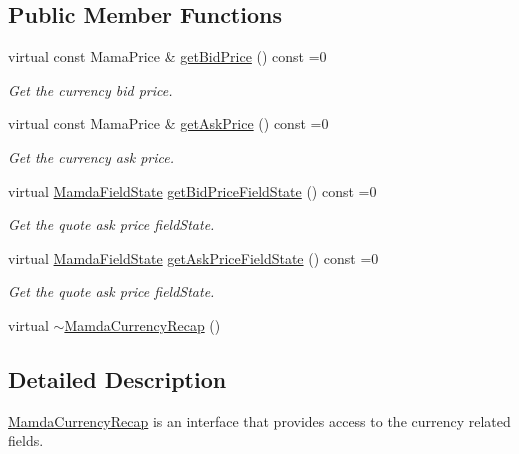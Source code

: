 \subsection*{Public Member Functions}
\begin{CompactItemize}
\item 
virtual const Mama\-Price \& \hyperlink{classWombat_1_1MamdaCurrencyRecap_bce12f317bf48ecab3175f6d1581f853}{get\-Bid\-Price} () const =0
\begin{CompactList}\small\item\em Get the currency bid price. \item\end{CompactList}\item 
virtual const Mama\-Price \& \hyperlink{classWombat_1_1MamdaCurrencyRecap_7f59a08ae952cfc742c9530d343784b7}{get\-Ask\-Price} () const =0
\begin{CompactList}\small\item\em Get the currency ask price. \item\end{CompactList}\item 
virtual \hyperlink{namespaceWombat_93aac974f2ab713554fd12a1fa3b7d2a}{Mamda\-Field\-State} \hyperlink{classWombat_1_1MamdaCurrencyRecap_402c9cbe8f4b3a19f0cd579cb5871b5b}{get\-Bid\-Price\-Field\-State} () const =0
\begin{CompactList}\small\item\em Get the quote ask price field\-State. \item\end{CompactList}\item 
virtual \hyperlink{namespaceWombat_93aac974f2ab713554fd12a1fa3b7d2a}{Mamda\-Field\-State} \hyperlink{classWombat_1_1MamdaCurrencyRecap_9c164af05a5d96f69f20dfdfd46d2211}{get\-Ask\-Price\-Field\-State} () const =0
\begin{CompactList}\small\item\em Get the quote ask price field\-State. \item\end{CompactList}\item 
virtual \hyperlink{classWombat_1_1MamdaCurrencyRecap_800867345be123689025daed5db9bd8d}{$\sim$Mamda\-Currency\-Recap} ()
\end{CompactItemize}


\subsection{Detailed Description}
\hyperlink{classWombat_1_1MamdaCurrencyRecap}{Mamda\-Currency\-Recap} is an interface that provides access to the currency related fields. 



